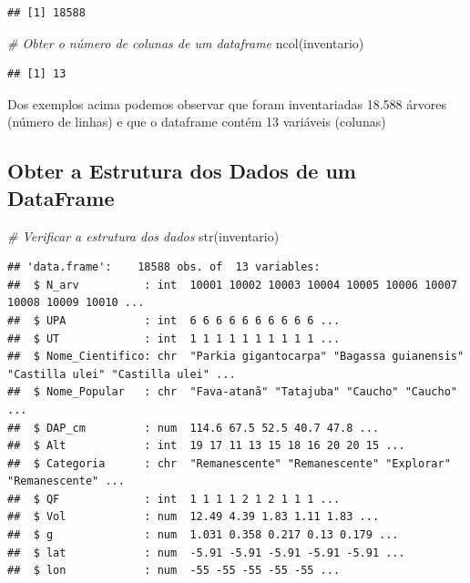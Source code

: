 \documentclass[
]{article}
\newenvironment{Shaded}{\begin{snugshade}}{\end{snugshade}}
\newcommand{\CommentTok}[1]{\textcolor[rgb]{0.56,0.35,0.01}{\textit{#1}}}
\newcommand{\FunctionTok}[1]{\textcolor[rgb]{0.00,0.00,0.00}{#1}}
\newcommand{\NormalTok}[1]{#1}
\begin{document}
\begin{verbatim}
## [1] 18588
\end{verbatim}

\begin{Shaded}
\begin{Highlighting}[]
\CommentTok{\# Obter o número de colunas de um dataframe}
\FunctionTok{ncol}\NormalTok{(inventario)}
\end{Highlighting}
\end{Shaded}

\begin{verbatim}
## [1] 13
\end{verbatim}

Dos exemplos acima podemos observar que foram inventariadas 18.588
árvores (número de linhas) e que o dataframe contém 13 variáveis
(colunas)

\hypertarget{obter-a-estrutura-dos-dados-de-um-dataframe}{%
\subsection{Obter a Estrutura dos Dados de um
DataFrame}\label{obter-a-estrutura-dos-dados-de-um-dataframe}}

\begin{Shaded}
\begin{Highlighting}[]
\CommentTok{\# Verificar a estrutura dos dados}
\FunctionTok{str}\NormalTok{(inventario)}
\end{Highlighting}
\end{Shaded}

\begin{verbatim}
## 'data.frame':    18588 obs. of  13 variables:
##  $ N_arv          : int  10001 10002 10003 10004 10005 10006 10007 10008 10009 10010 ...
##  $ UPA            : int  6 6 6 6 6 6 6 6 6 6 ...
##  $ UT             : int  1 1 1 1 1 1 1 1 1 1 ...
##  $ Nome_Cientifico: chr  "Parkia gigantocarpa" "Bagassa guianensis" "Castilla ulei" "Castilla ulei" ...
##  $ Nome_Popular   : chr  "Fava-atanã" "Tatajuba" "Caucho" "Caucho" ...
##  $ DAP_cm         : num  114.6 67.5 52.5 40.7 47.8 ...
##  $ Alt            : int  19 17 11 13 15 18 16 20 20 15 ...
##  $ Categoria      : chr  "Remanescente" "Remanescente" "Explorar" "Remanescente" ...
##  $ QF             : int  1 1 1 1 2 1 2 1 1 1 ...
##  $ Vol            : num  12.49 4.39 1.83 1.11 1.83 ...
##  $ g              : num  1.031 0.358 0.217 0.13 0.179 ...
##  $ lat            : num  -5.91 -5.91 -5.91 -5.91 -5.91 ...
##  $ lon            : num  -55 -55 -55 -55 -55 ...
\end{verbatim}
\end{document}
